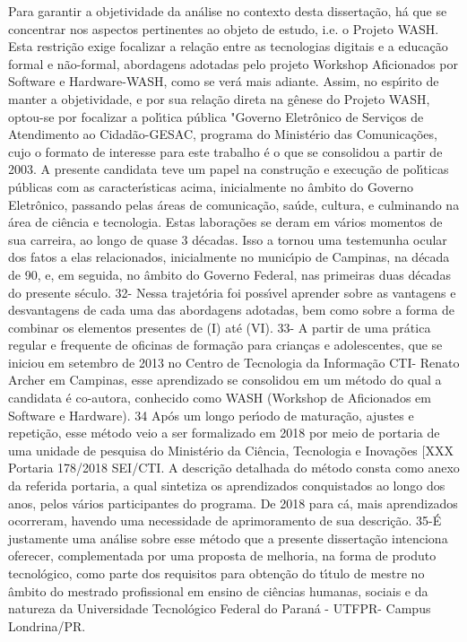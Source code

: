 \documentclass[
12pt,		%
openright,	%
twoside,  %
a4paper,			%
chapter=TITLE,		%
english,			%
french,				%
spanish,			%
brazil				%
]{USPSC-classe/USPSC}
\begin{document}
Para garantir a objetividade da an\'alise no contexto desta disserta\c{c}\~ao, h\'a que se concentrar nos aspectos pertinentes ao objeto de estudo, i.e. o Projeto WASH. Esta restri\c{c}\~ao exige focalizar a rela\c{c}\~ao entre as tecnologias digitais e a educa\c{c}\~ao formal e n\~ao-formal, abordagens adotadas pelo projeto Workshop Aficionados por Software e Hardware-WASH, como se ver\'a mais adiante.
Assim, no esp\'{\i}rito de manter a objetividade, e por sua rela\c{c}\~ao direta na g\^enese do Projeto WASH, optou-se por focalizar a pol\'{\i}tica p\'ublica "Governo Eletr\^onico de Servi\c{c}os de Atendimento ao Cidad\~ao-GESAC, programa do  Minist\'erio das Comunica\c{c}\~oes, cujo o formato de interesse para este trabalho \'e o que se consolidou a partir de 2003.
A presente candidata teve um papel na constru\c{c}\~ao e execu\c{c}\~ao de pol\'{\i}ticas p\'ublicas com as caracter\'{\i}sticas acima, inicialmente no \^ambito do Governo Eletr\^onico, passando pelas \'areas de comunica\c{c}\~ao, sa\'ude, cultura, e culminando na \'area de ci\^encia e tecnologia. Estas labora\c{c}\~oes  se deram em v\'arios momentos de sua carreira, ao longo de quase 3 d\'ecadas. Isso a tornou uma testemunha ocular dos fatos a elas relacionados, inicialmente no  munic\'{\i}pio de Campinas, na d\'ecada de 90, e, em seguida, no \^ambito do Governo Federal, nas primeiras duas d\'ecadas do presente s\'eculo.
32- Nessa trajet\'oria foi poss\'{\i}vel aprender sobre as vantagens e desvantagens de cada uma das abordagens adotadas, bem como sobre a forma de combinar os elementos presentes de (I) at\'e (VI).
33- A partir de uma pr\'atica regular e frequente de oficinas de forma\c{c}\~ao para  crian\c{c}as e adolescentes, que se iniciou em setembro de 2013 no Centro de Tecnologia da Informa\c{c}\~ao CTI- Renato Archer em Campinas, esse aprendizado se consolidou em um m\'etodo do qual a candidata \'e co-autora, conhecido como WASH (Workshop de Aficionados em Software e Hardware).
34 Ap\'os um longo per\'{\i}odo de matura\c{c}\~ao, ajustes e repeti\c{c}\~ao, esse m\'etodo veio a ser formalizado em 2018 por meio de portaria de uma unidade de pesquisa do Minist\'erio da Ci\^encia, Tecnologia e Inova\c{c}\~oes [XXX Portaria 178/2018 SEI/CTI. A descri\c{c}\~ao detalhada do m\'etodo consta como anexo da referida portaria, a qual sintetiza os aprendizados conquistados ao longo dos anos, pelos v\'arios participantes do programa. De 2018 para c\'a, mais aprendizados ocorreram, havendo uma necessidade de aprimoramento de sua descri\c{c}\~ao.
35-\'E justamente uma an\'alise sobre esse m\'etodo que a presente disserta\c{c}\~ao intenciona oferecer, complementada por uma proposta de melhoria, na forma de produto tecnol\'ogico, como parte dos requisitos para obten\c{c}\~ao do t\'{\i}tulo de mestre no \^ambito do mestrado profissional em ensino de ci\^encias humanas, sociais e da natureza da Universidade  Tecnol\'ogico  Federal do Paran\'a - UTFPR- Campus Londrina/PR.
\end{document}
